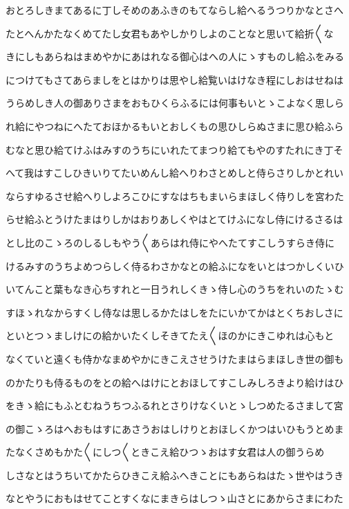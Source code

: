 \documentclass[a4paper,11pt,landscape]{ltjtarticle}
\begin{document}
おとろしきまてあるに丁しそめのあふきのもてならし給へるうつりかなとさへ
\par\medskip
たとへんかたなくめてたし女君もあやしかりしよのことなと思いて給折〱な
\par\medskip
きにしもあらねはまめやかにあはれなる御心はへの人にゝすものし給ふをみる
\par\medskip
につけてもさてあらましをとはかりは思やし給覧いはけなき程にしおはせねは
\par\medskip
うらめしき人の御ありさまをおもひくらふるには何事もいとゝこよなく思しら
\par\medskip
れ給にやつねにへたておほかるもいとおしくもの思ひしらぬさまに思ひ給ふら
\par\medskip
むなと思ひ給てけふはみすのうちにいれたてまつり給てもやのすたれにき丁そ
\par\medskip
へて我はすこしひきいりてたいめんし給へりわさとめしと侍らさりしかとれい
\par\medskip
ならすゆるさせ給へりしよろこひにすなはちもまいらまほしく侍りしを宮わた
\par\medskip
らせ給ふとうけたまはりしかはおりあしくやはとてけふになし侍にけるさるは
\par\medskip
とし比のこゝろのしるしもやう〱あらはれ侍にやへたてすこしうすらき侍に
\par\medskip
けるみすのうちよめつらしく侍るわさかなとの給ふになをいとはつかしくいひ
\par\medskip
いてんこと葉もなき心ちすれと一日うれしくきゝ侍し心のうちをれいのたゝむ
\par\medskip
すほゝれなからすくし侍なは思しるかたはしをたにいかてかはとくちおしさに
\par\medskip
といとつゝましけにの給かいたくしそきてたえ〱ほのかにきこゆれは心もと
\par\medskip
なくていと遠くも侍かなまめやかにきこえさせうけたまはらまほしき世の御も
\par\medskip
のかたりも侍るものをとの給へはけにとおほしてすこしみしろきより給けはひ
\par\medskip
をきゝ給にもふとむねうちつふるれとさりけなくいとゝしつめたるさまして宮
\par\medskip
の御こゝろはへおもはすにあさうおはしけりとおほしくかつはいひもうとめま
\par\medskip
たなくさめもかた〱にしつ〱ときこえ給ひつゝおはす女君は人の御うらめ
\par\medskip
しさなとはうちいてかたらひきこえ給ふへきことにもあらねはたゝ世やはうき
\par\medskip
なとやうにおもはせてことすくなにまきらはしつゝ山さとにあからさまにわた
\end{document}
